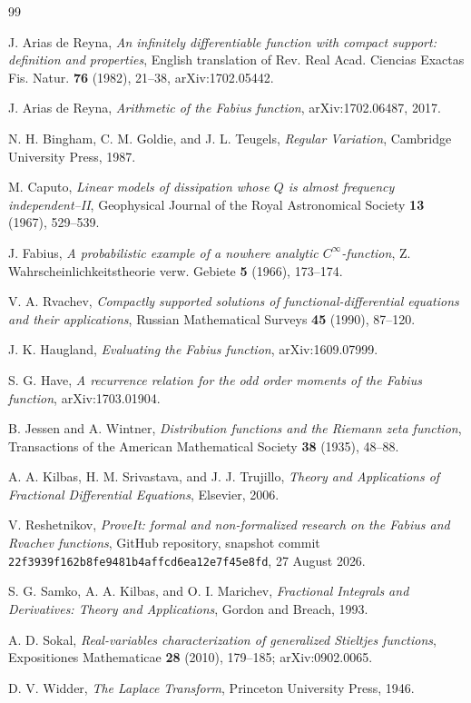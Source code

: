 \documentclass[11pt,oneside]{article}
\theoremstyle{definition}
\theoremstyle{remark}
\begin{document}
\begin{thebibliography}{99}

J. Arias de Reyna,
\emph{An infinitely differentiable function with compact support: definition
and properties}, English translation of Rev. Real Acad. Ciencias Exactas
Fis. Natur. \textbf{76} (1982), 21--38, arXiv:1702.05442.

J. Arias de Reyna,
\emph{Arithmetic of the Fabius function},
arXiv:1702.06487, 2017.

N. H. Bingham, C. M. Goldie, and J. L. Teugels,
\emph{Regular Variation}, Cambridge University Press, 1987.

M. Caputo,
\emph{Linear models of dissipation whose $Q$ is almost frequency
independent--II}, Geophysical Journal of the Royal Astronomical Society
\textbf{13} (1967), 529--539.

J. Fabius,
\emph{A probabilistic example of a nowhere analytic $C^\infty$-function},
Z. Wahrscheinlichkeitstheorie verw. Gebiete \textbf{5} (1966), 173--174.

V. A. Rvachev,
\emph{Compactly supported solutions of functional-differential equations
and their applications}, Russian Mathematical Surveys \textbf{45} (1990),
87--120.

J. K. Haugland,
\emph{Evaluating the Fabius function}, arXiv:1609.07999.

S. G. Have,
\emph{A recurrence relation for the odd order moments of the Fabius
function}, arXiv:1703.01904.

B. Jessen and A. Wintner,
\emph{Distribution functions and the Riemann zeta function},
Transactions of the American Mathematical Society \textbf{38} (1935),
48--88.

A. A. Kilbas, H. M. Srivastava, and J. J. Trujillo,
\emph{Theory and Applications of Fractional Differential Equations},
Elsevier, 2006.

V. Reshetnikov,
\emph{ProveIt: formal and non-formalized research on the Fabius and Rvachev
functions}, GitHub repository, snapshot commit
\texttt{22f3939f162b8fe9481b4affcd6ea12e7f45e8fd}, 27 August 2026.

S. G. Samko, A. A. Kilbas, and O. I. Marichev,
\emph{Fractional Integrals and Derivatives: Theory and Applications},
Gordon and Breach, 1993.

A. D. Sokal,
\emph{Real-variables characterization of generalized Stieltjes functions},
Expositiones Mathematicae \textbf{28} (2010), 179--185;
arXiv:0902.0065.

D. V. Widder,
\emph{The Laplace Transform}, Princeton University Press, 1946.

\end{thebibliography}
\end{document}
